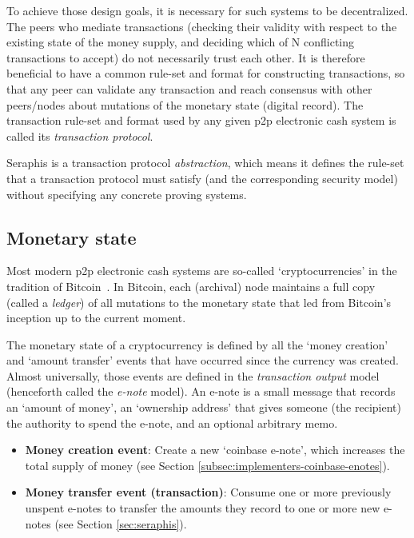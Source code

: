 To achieve those design goals, it is necessary for such systems to be decentralized. The peers who mediate transactions (checking their validity with respect to the existing state of the money supply, and deciding which of N conflicting transactions to accept) do not necessarily trust each other. It is therefore beneficial to have a common rule-set and format for constructing transactions, so that any peer can validate any transaction and reach consensus with other peers/nodes about mutations of the monetary state (digital record). The transaction rule-set and format used by any given p2p electronic cash system is called its {\em transaction protocol}.

Seraphis is a transaction protocol {\em abstraction}, which means it defines the rule-set that a transaction protocol must satisfy (and the corresponding security model) without specifying any concrete proving systems.


\subsection{Monetary state}
\label{subsec:intro-monetary-state}

Most modern p2p electronic cash systems are so-called `cryptocurrencies' in the tradition of Bitcoin~\cite{Nakamoto_bitcoin}. In Bitcoin, each (archival) node maintains a full copy (called a {\em ledger}) of all mutations to the monetary state that led from Bitcoin's inception up to the current moment.

The monetary state of a cryptocurrency is defined by all the `money creation' and `amount transfer' events that have occurred since the currency was created. Almost universally, those events are defined in the {\em transaction output} model (henceforth called the {\em e-note} model). An e-note is a small message that records an `amount of money', an `ownership address' that gives someone (the recipient) the authority to spend the e-note, and an optional arbitrary memo.

\begin{itemize}
    \item \textbf{Money creation event}: Create a new `coinbase e-note', which increases the total supply of money (see Section \ref{subsec:implementers-coinbase-enotes}).
    \item \textbf{Money transfer event (transaction)}: Consume one or more previously unspent e-notes to transfer the amounts they record to one or more new e-notes (see Section \ref{sec:seraphis}).
\end{itemize}

